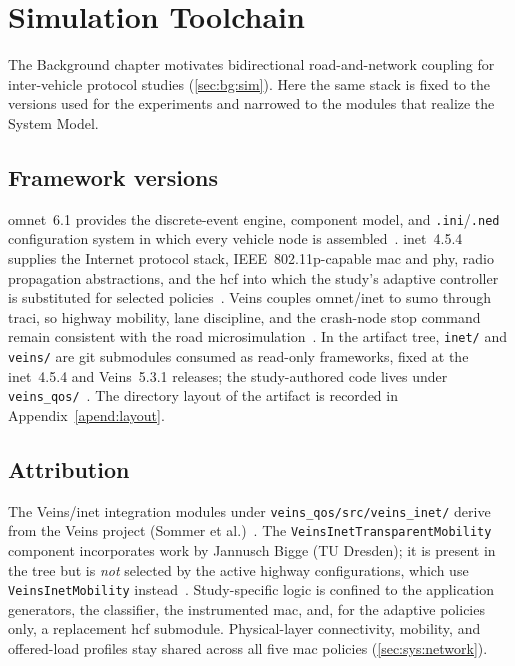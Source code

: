 \section{Simulation Toolchain}
\label{sec:impl:toolchain}

The Background chapter motivates bidirectional road-and-network coupling for inter-vehicle protocol studies (\autoref{sec:bg:sim}).
Here the same stack is fixed to the versions used for the experiments and narrowed to the modules that realize the System Model.

\subsection{Framework versions}
\label{sec:impl:versions}

\gls{omnet}~6.1 provides the discrete-event engine, component model, and \texttt{.ini}/\texttt{.ned} configuration system in which every vehicle node is assembled~\cite{varga2008omnetpp}.
\gls{inet}~4.5.4 supplies the Internet protocol stack, IEEE~802.11p-capable \gls{mac} and \gls{phy}, radio propagation abstractions, and the \gls{hcf} into which the study's adaptive controller is substituted for selected policies~\cite{inet_framework,IEEE80211e_2005}.
Veins couples \gls{omnet}/\gls{inet} to \gls{sumo} through \gls{traci}, so highway mobility, lane discipline, and the crash-node stop command remain consistent with the road microsimulation~\cite{veins_sommer2011,lopez2018sumo}.
In the artifact tree, \texttt{inet/} and \texttt{veins/} are git submodules consumed as read-only frameworks, fixed at the \gls{inet}~4.5.4 and Veins~5.3.1 releases; the study-authored code lives under \texttt{veins\_qos/}~\cite{aguiar2026_veins_qos}.
The directory layout of the artifact is recorded in Appendix~\ref{apend:layout}.

\subsection{Attribution}
\label{sec:impl:attribution}

The Veins/\gls{inet} integration modules under \texttt{veins\_qos/src/veins\_inet/} derive from the Veins project (Sommer et al.)~\cite{veins_sommer2011}.
The \texttt{VeinsInetTransparentMobility} component incorporates work by Jannusch Bigge (TU Dresden); it is present in the tree but is \emph{not} selected by the active highway configurations, which use \texttt{VeinsInetMobility} instead~\cite{aguiar2026_veins_qos}.
Study-specific logic is confined to the application generators, the classifier, the instrumented \gls{mac}, and, for the adaptive policies only, a replacement \gls{hcf} submodule.
Physical-layer connectivity, mobility, and offered-load profiles stay shared across all five \gls{mac} policies (\autoref{sec:sys:network}).

